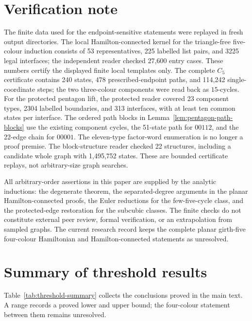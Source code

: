 \documentclass[11pt]{article}
\theoremstyle{remark}
\numberwithin{equation}{section}
\numberwithin{table}{section}
\begin{document}
\section{Verification note}
\label{sec:verification}

The finite data used for the endpoint-sensitive statements were replayed in fresh output directories.  The local Hamilton-connected kernel for the triangle-free five-colour induction consists of 53 representatives, 225 labelled list pairs, and 3225 legal interfaces; the independent reader checked 27,600 entry cases.  These numbers certify the displayed finite local templates only.  The complete $C_5$ certificate contains 240 states, 478 prescribed-endpoint paths, and 114,242 single-coordinate steps; the two three-colour components were read back as $15$-cycles.  For the protected pentagon lift, the protected reader covered 23 component types, 2304 labelled boundaries, and 313 interfaces, with at least ten common states per interface. The ordered path blocks in Lemma~\ref{lem:pentagon-path-blocks} use the existing component cycles, the 51-state path for $00112$, and the 22-edge chain for $00001$. The eleven-type factor-word enumeration is no longer a proof premise.  The block-structure reader checked 22 structures, including a candidate whole graph with 1,495,752 states.  These are bounded certificate replays, not arbitrary-size graph searches.

All arbitrary-order assertions in this paper are supplied by the analytic inductions: the degenerate theorem, the separated-degree arguments in the planar Hamilton-connected proofs, the Euler reductions for the few-five-cycle class, and the protected-edge restoration for the subcubic classes.  The finite checks do not constitute external peer review, formal verification, or an extrapolation from sampled graphs.  The current research record keeps the complete planar girth-five four-colour Hamiltonian and Hamilton-connected statements as unresolved.

\clearpage
\appendix
\section{Summary of threshold results}
\label{app:threshold-summary}
Table~\ref{tab:threshold-summary} collects the conclusions proved in the
main text. A range records a proved lower and upper bound; the
four-colour statement between them remains unresolved.
\end{document}
